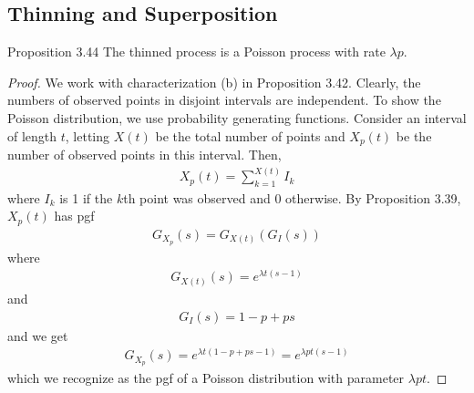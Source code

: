 \subsection{Thinning and Superposition}
%

\begin{boks}{Proposition 3.44}
  The thinned process is a Poisson process with rate $\lambda p$.
\end{boks}

\begin{proof}
  We work with characterization (b) in Proposition 3.42. Clearly, the numbers of observed points in disjoint intervals are independent.
  To show the Poisson distribution, we use probability generating functions.
  Consider an interval of length $t$, letting $X(t)$ be the total number of points and $X_p(t)$ be the number of observed points in this interval.
  Then,
  \begin{align*}
    X_p(t) = \sum_{k = 1}^{X(t)} I_k
  \end{align*}
  where $I_k$ is 1 if the $k$th point was observed and 0 otherwise. By Proposition 3.39, $X_p(t)$ has pgf
  \begin{align*}
    G_{X_p}(s) = G_{X(t)}(G_{I}(s))
  \end{align*}
  where
  \begin{align*}
    G_{X(t)}(s) = e^{\lambda t (s - 1)}
  \end{align*}
  and
  \begin{align*}
    G_I(s) = 1 - p + ps
  \end{align*}
  and we get
  \begin{align*}
    G_{X_p}(s) = e^{\lambda t(1 - p + ps - 1)} = e^{\lambda pt(s - 1)}
  \end{align*}
  which we recognize as the pgf of a Poisson distribution with parameter $\lambda pt$.
\end{proof}


